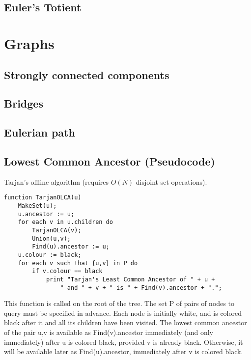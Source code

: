 \documentclass[9pt]{extarticle}
\begin{document}
\begin{multicols*}{3}
\subsection{Euler's Totient} %


\section{Graphs}

\subsection{Strongly connected components} %


\subsection{Bridges} %


\subsection{Eulerian path} %


\subsection{Lowest Common Ancestor (Pseudocode)} %
Tarjan's offline algorithm (requires $O(N)$ disjoint set operations).
\begin{lstlisting}
function TarjanOLCA(u)
    MakeSet(u);
    u.ancestor := u;
    for each v in u.children do
        TarjanOLCA(v);
        Union(u,v);
        Find(u).ancestor := u;
    u.colour := black;
    for each v such that {u,v} in P do
        if v.colour == black
            print "Tarjan's Least Common Ancestor of " + u +
                " and " + v + " is " + Find(v).ancestor + ".";
\end{lstlisting}
This function is called on the root of the tree. The set P of pairs of nodes to
query must be specified in advance. Each node is initially white, and is
colored black after it and all its children have been visited. The lowest
common ancestor of the pair {u,v} is available as Find(v).ancestor immediately
(and only immediately) after u is colored black, provided v is already black.
Otherwise, it will be available later as Find(u).ancestor, immediately after v
is colored black.


\end{multicols*}
\end{document}
